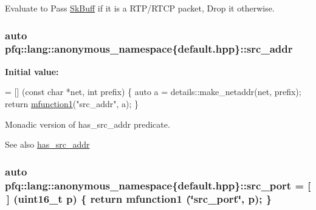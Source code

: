 Evaluate to {\ttfamily Pass} \hyperlink{structpfq_1_1lang_1_1SkBuff}{Sk\+Buff} if it is a R\+T\+P/\+R\+T\+C\+P packet, {\ttfamily Drop} it otherwise. 

\hypertarget{namespacepfq_1_1lang_1_1anonymous__namespace_02default_8hpp_03_a2ee09b5a65a64d60bc797b2ecd1c8a4a}{
\subsubsection[{src\+\_\+addr}]{\setlength{\rightskip}{0pt plus 5cm}auto pfq\+::lang\+::anonymous\+\_\+namespace\{default.\+hpp\}\+::src\+\_\+addr}}\label{namespacepfq_1_1lang_1_1anonymous__namespace_02default_8hpp_03_a2ee09b5a65a64d60bc797b2ecd1c8a4a}
{\bfseries Initial value\+:}
\begin{DoxyCode}
= [] (\textcolor{keyword}{const} \textcolor{keywordtype}{char} *net, \textcolor{keywordtype}{int} prefix)
        \{
            \textcolor{keyword}{auto} a = details::make\_netaddr(net, prefix);
            \textcolor{keywordflow}{return} \hyperlink{namespacepfq_1_1lang_a68d775c68562fbd0ab9ef213f2519499}{mfunction1}(\textcolor{stringliteral}{"src\_addr"}, a);
        \}
\end{DoxyCode}


Monadic version of {\ttfamily has\+\_\+src\+\_\+addr} predicate. 

\begin{DoxySeeAlso}{See also}
\hyperlink{namespacepfq_1_1lang_1_1anonymous__namespace_02default_8hpp_03_acb03dd3e34d6dd7e83d621fa9077194c}{has\+\_\+src\+\_\+addr} 
\end{DoxySeeAlso}
\hypertarget{namespacepfq_1_1lang_1_1anonymous__namespace_02default_8hpp_03_ad1645151270994a4f396565b70233b73}{
\subsubsection[{src\+\_\+port}]{\setlength{\rightskip}{0pt plus 5cm}auto pfq\+::lang\+::anonymous\+\_\+namespace\{default.\+hpp\}\+::src\+\_\+port = \mbox{[}$\,$\mbox{]} (uint16\+\_\+t p) \{ return {\bf mfunction1} (\char`\"{}src\+\_\+port\char`\"{}, p); \}}}\label{namespacepfq_1_1lang_1_1anonymous__namespace_02default_8hpp_03_ad1645151270994a4f396565b70233b73}


